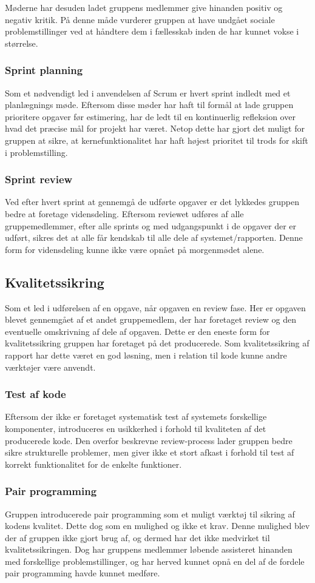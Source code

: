 Møderne har desuden ladet gruppens medlemmer give hinanden positiv og negativ kritik.
På denne måde vurderer gruppen at have undgået sociale problemstillinger ved at håndtere dem i fællesskab inden de har kunnet vokse i størrelse.

\subsubsection{Sprint planning}
Som et nødvendigt led i anvendelsen af Scrum er hvert sprint indledt med et planlægnings møde.
Eftersom disse møder har haft til formål at lade gruppen prioritere opgaver før estimering, har de ledt til en kontinuerlig refleksion over hvad det præcise mål for projekt har været.
Netop dette har gjort det muligt for gruppen at sikre, at kernefunktionalitet har haft højest prioritet til trods for skift i problemstilling.

\subsubsection{Sprint review}
Ved efter hvert sprint at gennemgå de udførte opgaver er det lykkedes gruppen bedre at foretage vidensdeling.
Eftersom reviewet udføres af alle gruppemedlemmer, efter alle sprints og med udgangspunkt i de opgaver der er udført, sikres det at alle får kendskab til alle dele af systemet/rapporten.
Denne form for vidensdeling kunne ikke være opnået på morgenmødet alene.

\subsection{Kvalitetssikring}
Som et led i udførelsen af en opgave, når opgaven en review fase.
Her er opgaven blevet gennemgået af et andet gruppemedlem, der har foretaget review og den eventuelle omskrivning af dele af opgaven.
Dette er den eneste form for kvalitetssikring gruppen har foretaget på det producerede.
Som kvalitetssikring af rapport har dette været en god løsning, men i relation til kode kunne andre værktøjer være anvendt.

\subsubsection{Test af kode}
Eftersom der ikke er foretaget systematisk test af systemets forskellige komponenter, introduceres en usikkerhed i forhold til kvaliteten af det producerede kode.
Den overfor beskrevne review-process lader gruppen bedre sikre strukturelle problemer, men giver ikke et stort afkast i forhold til test af korrekt funktionalitet for de enkelte funktioner.

\subsubsection{Pair programming}
Gruppen introducerede pair programming som et muligt værktøj til sikring af kodens kvalitet.
Dette dog som en mulighed og ikke et krav.
Denne mulighed blev der af gruppen ikke gjort brug af, og dermed har det ikke medvirket til kvalitetssikringen.
Dog har gruppens medlemmer løbende assisteret hinanden med forskellige problemstillinger, og har herved kunnet opnå en del af de fordele pair programming havde kunnet medføre.